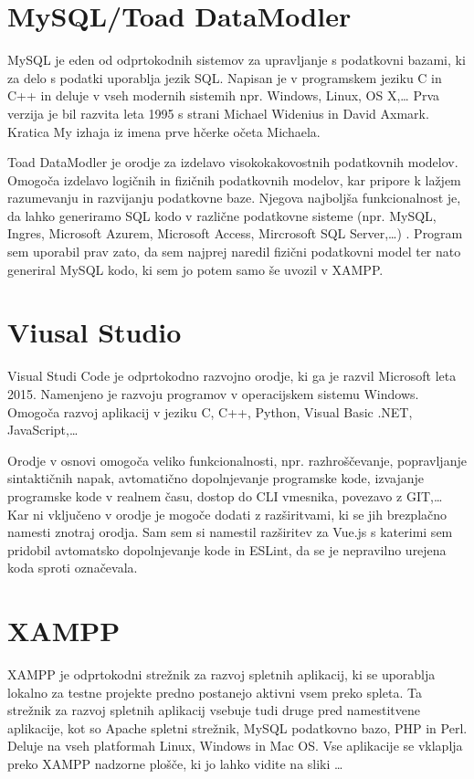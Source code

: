 \documentclass[a4paper, 12pt]{book}
\begin{document}
\section {MySQL/Toad DataModler}
MySQL je eden od odprtokodnih sistemov za upravljanje s podatkovni bazami, ki za delo s podatki uporablja jezik SQL. Napisan je v programskem jeziku C in C++ in deluje v vseh modernih sistemih npr. Windows, Linux, OS X,… Prva verzija je bil razvita leta 1995 s strani Michael Widenius in David Axmark. Kratica My izhaja iz imena prve hčerke očeta Michaela.  


Toad DataModler je orodje za izdelavo visokokakovostnih podatkovnih modelov. Omogoča izdelavo logičnih in fizičnih podatkovnih modelov, kar pripore k lažjem razumevanju in razvijanju podatkovne baze. Njegova najboljša funkcionalnost je, da lahko generiramo SQL kodo v različne podatkovne sisteme (npr. MySQL, Ingres, Microsoft Azurem, Microsoft Access, Mircrosoft SQL Server,…) . Program sem uporabil prav zato, da sem najprej naredil fizični podatkovni model ter nato generiral MySQL kodo, ki sem jo potem samo še uvozil v XAMPP. 

\section {Viusal Studio}
Visual Studi Code je odprtokodno razvojno orodje, ki ga je razvil Microsoft leta 2015. Namenjeno je razvoju programov v operacijskem sistemu Windows. Omogoča razvoj aplikacij v jeziku C, C++, Python, Visual Basic .NET, JavaScript,… 

Orodje v osnovi omogoča veliko funkcionalnosti, npr. razhroščevanje, popravljanje sintaktičnih napak, avtomatično dopolnjevanje programske kode, izvajanje programske kode v realnem času, dostop do CLI vmesnika, povezavo z GIT,… Kar ni vključeno v orodje je mogoče dodati z razširitvami, ki se jih brezplačno namesti znotraj orodja. Sam sem si namestil razširitev za Vue.js s katerimi sem pridobil avtomatsko dopolnjevanje kode in ESLint, da se je nepravilno urejena koda sproti označevala.  

\section {XAMPP}
XAMPP je odprtokodni strežnik za razvoj spletnih aplikacij, ki se uporablja lokalno za testne projekte predno postanejo aktivni vsem preko spleta. Ta strežnik za razvoj spletnih aplikacij vsebuje tudi druge pred namestitvene aplikacije, kot so Apache spletni strežnik, MySQL podatkovno bazo, PHP in Perl. Deluje na vseh platformah Linux, Windows in Mac OS. Vse aplikacije se vklaplja preko XAMPP nadzorne plošče, ki jo lahko vidite na sliki …
\end{document}
